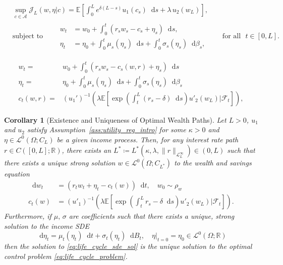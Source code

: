 \documentclass[10pt,a4paper]{amsart}
\theoremstyle{plain}
\newtheorem{cor}{Corollary}
\theoremstyle{plain}
\theoremstyle{definition}
\theoremstyle{remark}
\newcommand{\EE}{\mathbb{E}}
\newcommand{\RR}{\mathbb{R}}
\newcommand{\cF}{\mathcal{F}}
\newcommand{\dd}{\mathop{}\!\mathrm{d}}
\newcommand{\mbR}{\mathbb{R}}
\newcommand{\mcA}{\mathcal{A}}
\newcommand{\mcJ}{\mathcal{J}}
\newcommand{\msL}{\mathscr{L}}
\newcommand{\scL}{\mathscr{L}}
\newcommand{\tzero}{|_{t=0}}
\begin{document}
\begin{equation}\label{eq:life_cycle_problem}
\begin{aligned}
     &\sup_{c\in \mcA}\mcJ_L(w,\eta|c)=\EE\left[\int_0^L e^{\delta(L- s)}u_1(c_s)\dd s + \lambda \, u_2(w_L)\right],\\
      &\text{subject to}  \qquad \begin{aligned}
        w_t &=w_0 + \int_0^t (r_s w_s-c_s+\eta_s)\dd s,
        \\
         \eta_t &= \eta_0 + \int_0^t \mu_s(\eta_s) \dd s +\int_0^t \sigma_s(\eta_s) \dd \beta_s,
    \end{aligned} \qquad \text{for all }\,\, t\in [0,L].
\end{aligned}
%  
\end{equation}

\begin{equation}\label{eq:triple_equations}
    \begin{aligned}
        w_t =&w_0 + \int_0^t \left(r_s w_s -c_s(w,r) +\eta_s \right)\dd s 
        \\
      \eta_t = &\eta_0 + \int_0^t \mu_s(\eta_s) \dd s +  \int_0^t\sigma_s(\eta_s)\dd   \beta_s 
        \\
        c_t(w,r) = & (u_1')^{-1}\left(\lambda \EE\left[\exp\left(\int_t^L (r_s-\delta)\dd s\right) u'_2(w_L)|\cF_t\right]\right),
    \end{aligned}
\end{equation}

\begin{cor}[Existence and Uniqueness of Optimal Wealth Paths] \label{cor:life_cycle_well_posed}
 Let $L>0$, $u_1$ and $u_2$ satisfy Assumption~\ref{ass:utility_reg_intro} for some $\kappa>0$ and $\eta \in \msL^0(\Omega;C_L)$ be a given income process.
  Then, for any interest rate path $r\in C([0,L];\RR)$, there exists an $L^* \coloneqq L^*(\kappa,\lambda,\|r\|_{\msL^\infty_L})\in (0,L)$ such that there exists a unique strong solution $w \in \scL^0(\Omega;C_{L^*}) $ to the wealth and savings equation
  \begin{equation}\label{eq:life_cycle_sde_sol}
       \begin{aligned}
        \dd w_t& = (r_tw_t +\eta_t -c_t(w))\dd t,\quad w_0\sim \rho_w
        \\
        c_t(w)&= (u'_1)^{-1} \left( \lambda \EE \left[ \exp\left( \int_t^L r_s-\delta \dd s \right) u'_2(w_L) |\cF_t\right]\right).
  \end{aligned}
  \end{equation}
%
Furthermore, if $\mu,\, \sigma$ are coefficients such that there exists a unique, strong solution to the income SDE
 \begin{equation}\label{eq:life_cycle_sde_income}
     \dd \eta_t = \mu_t(\eta_t)\dd t + \sigma_t(\eta_t)\dd B_t, \quad \eta\tzero = \eta_0 \in \msL^0(\Omega;\mbR)
 \end{equation}
%
then the solution to \eqref{eq:life_cycle_sde_sol} is the unique solution to the optimal control problem \eqref{eq:life_cycle_problem}. 
\end{cor}
\end{document}
